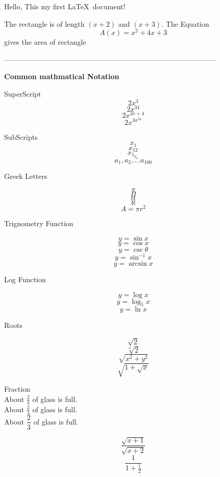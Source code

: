 \documentclass[]{article}
\begin{document}
Hello, This my first \LaTeX\ document!

The rectangle is of length $(x+2)$ and $(x+3)$.
The Equation $${A(x)=x^2+4x+3}$$ gives the area of rectangle

-----------------------------------------------------------------------------------------

\textbf{Common mathmatical Notation}

SuperScript $$2x^3$$
$$2x^{34}$$
$$2x^{2x+4}$$
$$2x^{3x^{54}}$$

SubScripts  $${x_1}$$
$${x_{12}}$$
$${x_{1_{2_{3_4}}}}$$
$${a_1}, {a_2}, \ldots {a_{100}}$$

Greek Letters   

$$\pi$$
$$\Pi$$
$$\alpha$$
$$\aleph$$
$$A= \pi r^2$$

Trignometry Function

$$y=\sin x$$
$$ y = \cos x $$
$$ y = \csc \theta $$
$$ y = \sin ^{-1} x $$
$$ y = \arcsin x $$


Log Function

$$ y = \log x $$
$$ y = \log_5 x $$
$$ y = \ln x $$

Roots

$$ \sqrt{2} $$
$$ \sqrt[3]{2} $$
$$ \sqrt{x^2 + y^2} $$
$$ \sqrt{ 1 + \sqrt{x} } $$


Fraction \\[16pt]

About $ \frac{2}{3} $ of glass is full.\\[16pt]
About $ \displaystyle \frac{2}{3} $ of glass is full.\\[16pt]
About $  \dfrac{2}{3} $ of glass is full.

$$ \frac{ \sqrt{x+1} } { \sqrt{x+2} } $$
$$ \frac{ 1 } { 1+ \frac{1}{2} } $$
\end{document}
